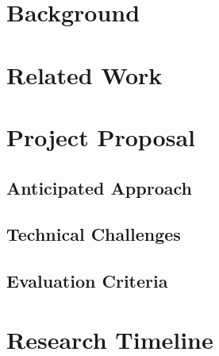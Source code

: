 \documentclass{sig-alternate}
\begin{document}
\section{Background}
\label{sec:background}


\section{Related Work}
\label{sec:related_work}


\section{Project Proposal}
\label{sec:project_proposal}


\subsection{Anticipated Approach}
\label{subsec:approach}


\subsection{Technical Challenges}
\label{subsec:tech_challenges}


\subsection{Evaluation Criteria}
\label{subsec:eval_criteria}


\section{Research Timeline}
\label{sec:research_timeline}


\end{document}
